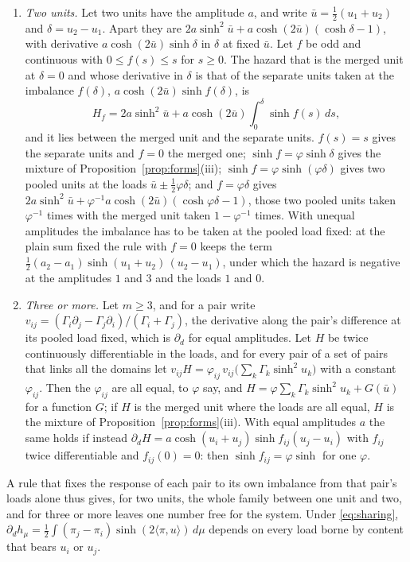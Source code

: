 \begin{proposition}\label{prop:pairrule}
\leavevmode
\begin{enumerate}[label=\emph{(\roman*)},itemsep=1pt]
\item \emph{Two units.} Let two units have the amplitude $a$, and write
$\bar u=\tfrac12(u_1+u_2)$ and $\delta=u_2-u_1$. Apart they are
$2a\sinh^2\bar u+a\cosh(2\bar u)(\cosh\delta-1)$, with derivative
$a\cosh(2\bar u)\sinh\delta$ in $\delta$ at fixed $\bar u$. Let $f$ be
odd and continuous with $0\le f(s)\le s$ for $s\ge0$. The hazard that is
the merged unit at $\delta=0$ and whose derivative in $\delta$ is that of
the separate units taken at the imbalance $f(\delta)$,
$a\cosh(2\bar u)\sinh f(\delta)$, is
\[
H_f=2a\sinh^2\bar u+a\cosh(2\bar u)\int_0^\delta\sinh f(s)\,ds,
\]
and it lies between the merged unit and the separate units. $f(s)=s$
gives the separate units and $f=0$ the merged one;
$\sinh f=\varphi\sinh\delta$ gives the mixture of
Proposition~\ref{prop:forms}(iii);
$\sinh f=\varphi\sinh(\varphi\delta)$ gives two pooled units at the loads
$\bar u\pm\tfrac12\varphi\delta$; and $f=\varphi\delta$ gives
$2a\sinh^2\bar u+\varphi^{-1}a\cosh(2\bar u)(\cosh\varphi\delta-1)$, those
two pooled units taken $\varphi^{-1}$ times with the merged unit taken
$1-\varphi^{-1}$ times. With unequal amplitudes the imbalance has to be
taken at the pooled load fixed: at the plain sum fixed the rule with
$f=0$ keeps the term $\tfrac12(a_2-a_1)\sinh(u_1+u_2)\,(u_2-u_1)$, under
which the hazard is negative at the amplitudes $1$ and $3$ and the loads
$1$ and $0$.
\item \emph{Three or more.} Let $m\ge3$, and for a pair write
$v_{ij}=(\Gamma_i\partial_j-\Gamma_j\partial_i)/(\Gamma_i+\Gamma_j)$, the
derivative along the pair's difference at its pooled load fixed, which is
$\partial_d$ for equal amplitudes. Let $H$ be twice continuously
differentiable in the loads, and for every pair of a set of pairs that
links all the domains let
$v_{ij}H=\varphi_{ij}\,v_{ij}\bigl(\sum_k\Gamma_k\sinh^2u_k\bigr)$ with
a constant $\varphi_{ij}$. Then the $\varphi_{ij}$ are all equal, to
$\varphi$ say, and $H=\varphi\sum_k\Gamma_k\sinh^2u_k+G(\bar u)$ for a
function $G$; if $H$ is the merged unit where the loads are all equal,
$H$ is the mixture of Proposition~\ref{prop:forms}(iii). With equal
amplitudes $a$ the same holds if instead
$\partial_dH=a\cosh(u_i+u_j)\sinh f_{ij}(u_j-u_i)$ with $f_{ij}$ twice
differentiable and $f_{ij}(0)=0$: then $\sinh f_{ij}=\varphi\sinh$ for
one $\varphi$.
\end{enumerate}
A rule that fixes the response of each pair to its own imbalance from
that pair's loads alone thus gives, for two units, the whole family
between one unit and two, and for three or more leaves one number free
for the system. Under \eqref{eq:sharing},
$\partial_dh_\mu=\tfrac12\int(\pi_j-\pi_i)\sinh(2\langle\pi,u\rangle)\,d\mu$
depends on every load borne by content that bears $u_i$ or $u_j$.
\end{proposition}

